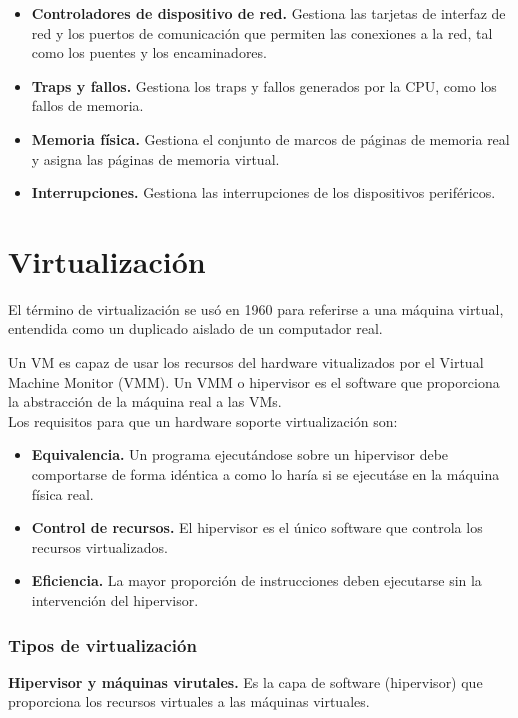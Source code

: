 \documentclass{article}
\begin{document}
\begin{itemize}
				\item \textbf{Controladores de dispositivo de red.} Gestiona las tarjetas de interfaz de red y los puertos de comunicación que permiten las conexiones a la red, tal como los puentes y los encaminadores. 
				\item \textbf{Traps y fallos.} Gestiona los traps y fallos generados por la CPU, como los fallos de memoria.
				\item \textbf{Memoria física.} Gestiona el conjunto de marcos de páginas de memoria real y asigna las páginas de memoria virtual.
				\item \textbf{Interrupciones.} Gestiona las interrupciones de los dispositivos periféricos.
				\end{itemize}
				
	\section{Virtualización}
		El término de virtualización se usó en 1960 para referirse a una máquina virtual, entendida como un duplicado aislado de un computador real.
		
		Un VM es capaz de usar los recursos del hardware vitualizados por el Virtual Machine Monitor (VMM). Un 	VMM o hipervisor es el software que proporciona la abstracción de la máquina real a las VMs. \\
		
		Los requisitos para que un hardware soporte virtualización son:
		
		\begin{itemize}
		\item \textbf{Equivalencia.} Un programa ejecutándose sobre un hipervisor debe comportarse de forma idéntica a como lo haría si se ejecutáse en la máquina física real.
		\item \textbf{Control de recursos.} El hipervisor es el único software que controla los recursos virtualizados.
		\item \textbf{Eficiencia.} La mayor proporción de instrucciones deben ejecutarse sin la intervención del hipervisor.
		\end{itemize}	
		
		\subsubsection{Tipos de virtualización}
			\textbf{Hipervisor y máquinas virutales.} Es la capa de software (hipervisor) que proporciona los recursos virtuales a las máquinas virtuales.
			
\end{document}
